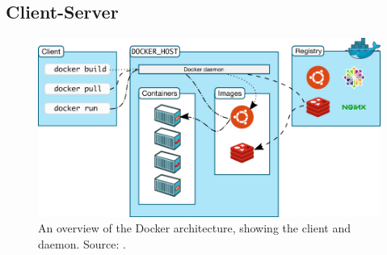 \subsection{Client-Server}
\begin{figure}[H]
\caption{An overview of the Docker architecture, showing the client and daemon. Source: \cite{dockerarchi}.}
\centering
\includegraphics[scale=0.4]{4-softwarearch/images/architecture.png}
\end{figure}

